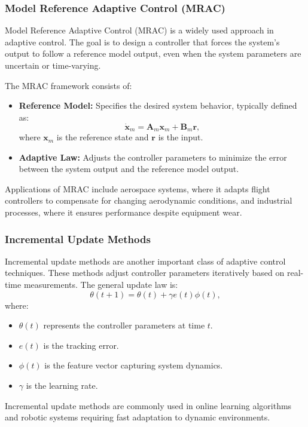 \documentclass{IEEEojcsys}
\begin{document}
\subsubsection{Model Reference Adaptive Control (MRAC)}
Model Reference Adaptive Control (MRAC) is a widely used approach in adaptive control. The goal is to design a controller that forces the system's output to follow a reference model output, even when the system parameters are uncertain or time-varying. 

The MRAC framework consists of:
\begin{itemize}
    \item \textbf{Reference Model:} Specifies the desired system behavior, typically defined as:
    \[
    \dot{\mathbf{x}}_m = \mathbf{A}_m \mathbf{x}_m + \mathbf{B}_m \mathbf{r},
    \]
    where $\mathbf{x}_m$ is the reference state and $\mathbf{r}$ is the input.
    \item \textbf{Adaptive Law:} Adjusts the controller parameters to minimize the error between the system output and the reference model output.
\end{itemize}

Applications of MRAC include aerospace systems, where it adapts flight controllers to compensate for changing aerodynamic conditions, and industrial processes, where it ensures performance despite equipment wear.

\subsubsection{Incremental Update Methods}
Incremental update methods are another important class of adaptive control techniques. These methods adjust controller parameters iteratively based on real-time measurements. The general update law is:
\[
\theta(t+1) = \theta(t) + \gamma e(t)\phi(t),
\]
where:
\begin{itemize}
    \item $\theta(t)$ represents the controller parameters at time $t$.
    \item $e(t)$ is the tracking error.
    \item $\phi(t)$ is the feature vector capturing system dynamics.
    \item $\gamma$ is the learning rate.
\end{itemize}
Incremental update methods are commonly used in online learning algorithms and robotic systems requiring fast adaptation to dynamic environments.
\end{document}
